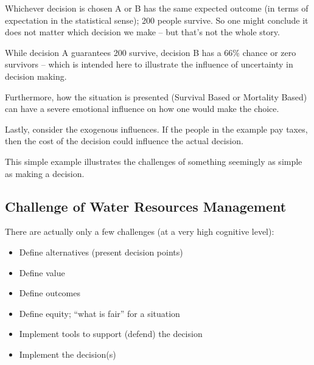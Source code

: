 Whichever decision is chosen A or B has the same expected outcome (in terms of expectation in the statistical sense); 200 people survive.
So one might conclude it does not matter which decision we make -- but that's not the whole story.  

While decision A guarantees 200 survive, decision B has a 66\% chance or zero survivors -- which is intended here to illustrate the influence of uncertainty in decision making.

Furthermore, how the situation is presented (Survival Based or Mortality Based) can have a severe emotional influence on how one would make the choice.

Lastly, consider the exogenous influences.  If the people in the example pay taxes, then the cost of the decision could influence the actual decision.

This simple example illustrates the challenges of something seemingly as simple as making a decision.

\subsection{Challenge of Water Resources Management}
There are actually only a few challenges (at a very high cognitive level):
\begin{itemize}
\item Define alternatives (present decision points)
\item Define value
\item Define outcomes
\item Define equity; ``what is fair'' for a situation
\item Implement tools to support (defend) the decision
\item Implement the decision(s)
\end{itemize}


